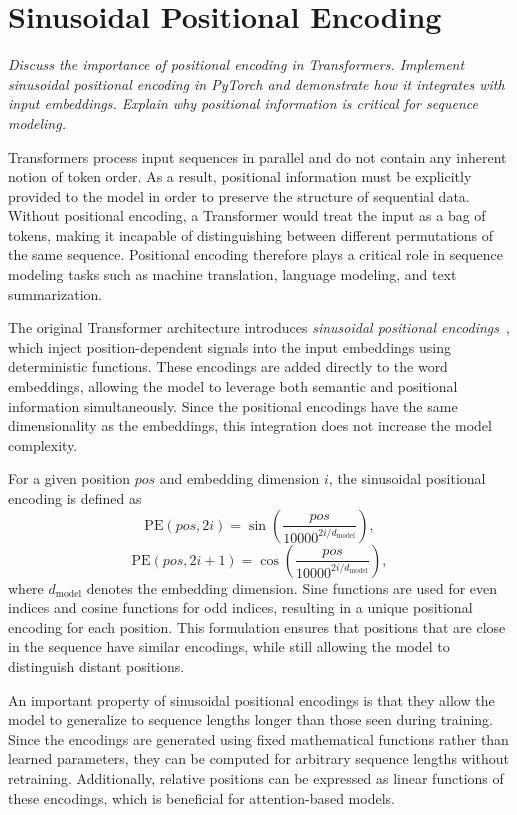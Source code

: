 \section{Sinusoidal Positional Encoding}\label{sec:sinusoidal_positional_encoding} 
\textit{Discuss the importance of positional encoding in Transformers. Implement
sinusoidal positional encoding in PyTorch and demonstrate how it integrates with
input embeddings. Explain why positional information is critical for sequence
modeling.}

Transformers process input sequences in parallel and do not
contain any inherent notion of token order.
As a result, positional information must be explicitly
provided to the model in order to preserve the structure
of sequential data.
Without positional encoding, a Transformer would treat
the input as a bag of tokens, making it incapable of
distinguishing between different permutations of the same
sequence.
Positional encoding therefore plays a critical role in
sequence modeling tasks such as machine translation,
language modeling, and text summarization.

The original Transformer architecture introduces
\emph{sinusoidal positional encodings}~\cite{vaswaniAttentionAllYou2017},
which inject position-dependent signals into the input
embeddings using deterministic functions.
These encodings are added directly to the word embeddings,
allowing the model to leverage both semantic and positional
information simultaneously.
Since the positional encodings have the same dimensionality
as the embeddings, this integration does not increase
the model complexity.

For a given position $pos$ and embedding dimension $i$,
the sinusoidal positional encoding is defined as
\begin{equation}
\text{PE}(pos, 2i) = \sin\left(\frac{pos}{10000^{2i / d_{\text{model}}}}\right),
\end{equation}
\begin{equation}
\text{PE}(pos, 2i + 1) = \cos\left(\frac{pos}{10000^{2i / d_{\text{model}}}}\right),
\end{equation}
where $d_{\text{model}}$ denotes the embedding dimension.
Sine functions are used for even indices and cosine
functions for odd indices, resulting in a unique positional
encoding for each position.
This formulation ensures that positions that are close in
the sequence have similar encodings, while still allowing
the model to distinguish distant positions.

An important property of sinusoidal positional encodings
is that they allow the model to generalize to sequence
lengths longer than those seen during training.
Since the encodings are generated using fixed mathematical
functions rather than learned parameters, they can be
computed for arbitrary sequence lengths without retraining.
Additionally, relative positions can be expressed as linear
functions of these encodings, which is beneficial for
attention-based models.

